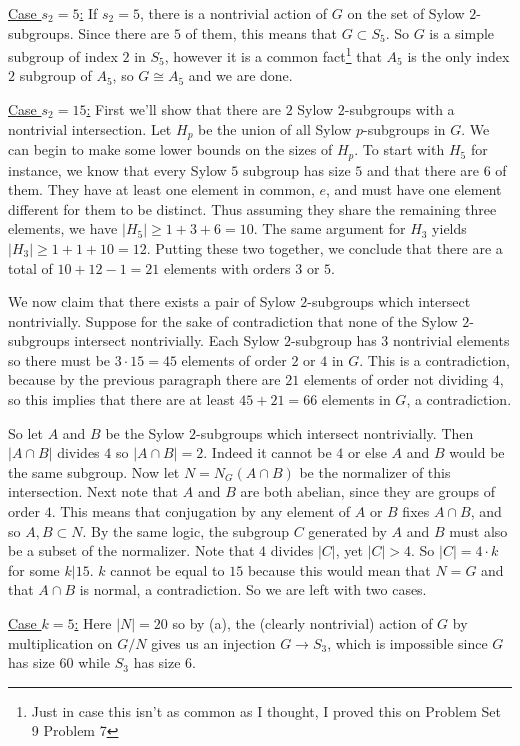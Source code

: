 \documentclass[11pt, letterpaper]{article}
\begin{document}
\underline{Case $s_2=5$:} If $s_2=5$, there is a nontrivial action of $G$ on the set of Sylow $2$-subgroups. Since there are $5$ of them, this means that $G\subset S_5$. So $G$ is a simple subgroup of index $2$ in $S_5$, however it is a common fact\footnote{Just in case this isn't as common as I thought, I proved this on Problem Set 9 Problem 7 } that $A_5$ is the only index $2$ subgroup of $A_5$, so $G\cong A_5$ and we are done.

\underline{Case $s_2=15$:} First we'll show that there are $2$ Sylow $2$-subgroups with a nontrivial intersection. Let $H_p$ be the union of all Sylow $p$-subgroups in $G$. We can begin to make some lower bounds on the sizes of $H_p$. To start with $H_5$ for instance, we know that every Sylow $5$ subgroup has size $5$ and that there are $6$ of them. They have at least one element in common, $e$, and must have one element different for them to be distinct. Thus assuming they share the remaining three elements, we have $|H_5| \geq  1+3 + 6 = 10$. The same argument for $H_3$ yields $|H_3|\geq 1+1+10=12$. Putting these two together, we conclude that there are a total of $10+12-1=21$ elements with orders $3$ or $5$.

We now claim that there exists a pair of Sylow $2$-subgroups which intersect nontrivially. Suppose for the sake of contradiction that none of the Sylow $2$-subgroups intersect nontrivially. Each Sylow $2$-subgroup has $3$ nontrivial elements so there must be $3\cdot 15=45$ elements of order $2$ or $4$ in $G$. This is a contradiction, because by the previous paragraph there are $21$ elements of order not dividing $4$, so this implies that there are at least $45+21=66$ elements in $G$, a contradiction.

So let $A$ and $B$ be the Sylow $2$-subgroups which intersect nontrivially. Then $|A\cap B|$ divides $4$ so $|A\cap B|=2$. Indeed it cannot be $4$ or else $A$ and $B$ would be the same subgroup. Now let $N=N_G(A\cap B)$ be the normalizer of this intersection. Next note that $A$ and $B$ are both abelian, since they are groups of order $4$. This means that conjugation by any element of $A$ or $B$ fixes $A\cap B$, and so $A,B\subset N$. By the same logic, the subgroup $C$ generated by $A$ and $B$ must also be a subset of the normalizer. Note that $4$ divides $|C|$, yet $|C|>4$. So $|C|=4\cdot k$ for some $k|15$. $k$ cannot be equal to $15$ because this would mean that $N=G$ and that $A\cap B$ is normal, a contradiction. So we are left with two cases.

\underline{Case $k=5$:} Here $|N|=20$ so by (a), the (clearly nontrivial) action of $G$ by multiplication on $G/N$ gives us an injection $G\to S_3$, which is impossible since $G$ has size $60$ while $S_3$ has size $6$.
\end{document}
